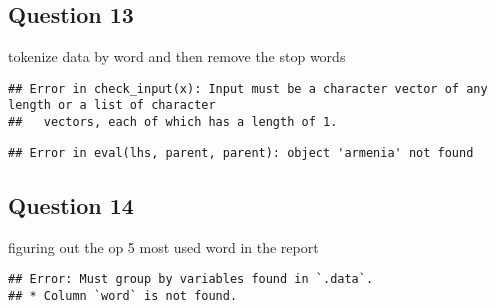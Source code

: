 \documentclass[
]{article}
\newenvironment{Shaded}{\begin{snugshade}}{\end{snugshade}}
\newcommand{\DataTypeTok}[1]{\textcolor[rgb]{0.13,0.29,0.53}{#1}}
\newcommand{\KeywordTok}[1]{\textcolor[rgb]{0.13,0.29,0.53}{\textbf{#1}}}
\newcommand{\NormalTok}[1]{#1}
\newcommand{\OperatorTok}[1]{\textcolor[rgb]{0.81,0.36,0.00}{\textbf{#1}}}
\newcommand{\OtherTok}[1]{\textcolor[rgb]{0.56,0.35,0.01}{#1}}
\newcommand{\StringTok}[1]{\textcolor[rgb]{0.31,0.60,0.02}{#1}}
\begin{document}
\hypertarget{question-13}{%
\subsection{Question 13}\label{question-13}}

tokenize data by word and then remove the stop words

\begin{Shaded}
\end{Shaded}

\begin{verbatim}
## Error in check_input(x): Input must be a character vector of any length or a list of character
##   vectors, each of which has a length of 1.
\end{verbatim}

\begin{Shaded}
\end{Shaded}

\begin{verbatim}
## Error in eval(lhs, parent, parent): object 'armenia' not found
\end{verbatim}

\hypertarget{question-14}{%
\subsection{Question 14}\label{question-14}}

figuring out the op 5 most used word in the report

\begin{Shaded}
\end{Shaded}

\begin{verbatim}
## Error: Must group by variables found in `.data`.
## * Column `word` is not found.
\end{verbatim}
\end{document}
